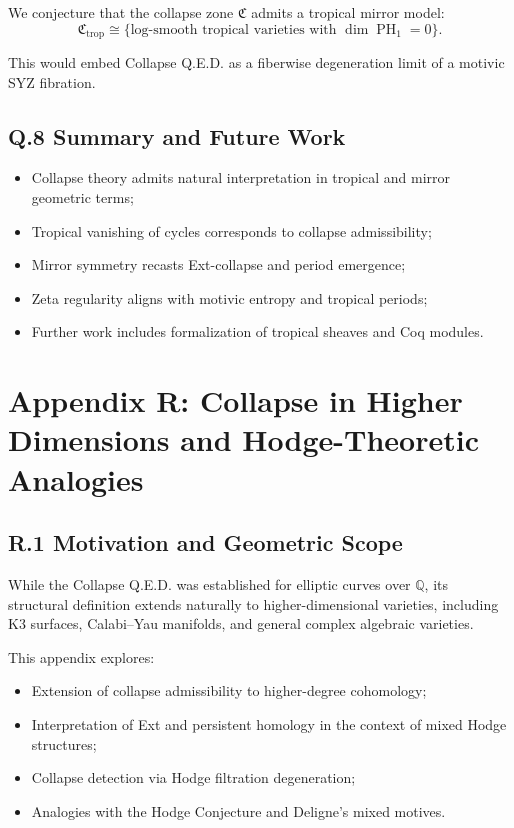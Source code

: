\documentclass[11pt]{article}
\DeclareMathOperator{\PH}{PH}
\begin{document}
We conjecture that the collapse zone \( \mathfrak{C} \) admits a tropical mirror model:
\[
\mathfrak{C}_{\mathrm{trop}} \cong \{ \text{log-smooth tropical varieties with } \dim \PH_1 = 0 \}.
\]

This would embed Collapse Q.E.D. as a fiberwise degeneration limit of a motivic SYZ fibration.

\subsection*{Q.8 Summary and Future Work}

\begin{itemize}
  \item Collapse theory admits natural interpretation in tropical and mirror geometric terms;
  \item Tropical vanishing of cycles corresponds to collapse admissibility;
  \item Mirror symmetry recasts Ext-collapse and period emergence;
  \item Zeta regularity aligns with motivic entropy and tropical periods;
  \item Further work includes formalization of tropical sheaves and Coq modules.
\end{itemize}



\appendix
\section*{Appendix R: Collapse in Higher Dimensions and Hodge-Theoretic Analogies}

\subsection*{R.1 Motivation and Geometric Scope}

While the Collapse Q.E.D. was established for elliptic curves over \( \mathbb{Q} \), its structural definition extends naturally to higher-dimensional varieties, including K3 surfaces, Calabi–Yau manifolds, and general complex algebraic varieties.

This appendix explores:

\begin{itemize}
  \item Extension of collapse admissibility to higher-degree cohomology;
  \item Interpretation of Ext and persistent homology in the context of mixed Hodge structures;
  \item Collapse detection via Hodge filtration degeneration;
  \item Analogies with the Hodge Conjecture and Deligne’s mixed motives.
\end{itemize}
\end{document}
